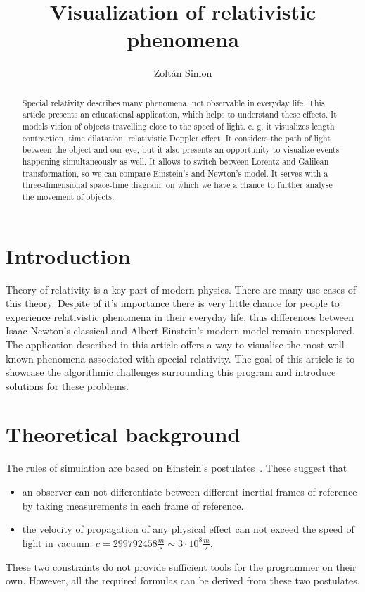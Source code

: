 \documentclass{egpubl}
\title[Visualization of relativity]{Visualization of relativistic phenomena}
\author{Zoltán Simon}
\begin{document}
\maketitle

\begin{abstract}
Special relativity describes many phenomena, not observable in everyday life. This article presents an educational application, which helps to understand these effects. It models vision of objects travelling close to the speed of light. e. g. it visualizes length contraction, time dilatation, relativistic Doppler effect. It considers the path of light between the object and our eye, but it also presents an opportunity to visualize events happening simultaneously as well. It allows to switch between Lorentz and Galilean transformation, so we can compare Einstein's and Newton's model. It serves with a three-dimensional space-time diagram, on which we have a chance to further analyse the movement of objects.
\end{abstract}

\section{Introduction}
\label{sec:introduction}
Theory of relativity is a key part of modern physics. There are many use cases of this theory. Despite of it's importance there is very little chance for people to experience relativistic phenomena in their everyday life, thus differences between Isaac Newton's classical and Albert Einstein's modern model remain unexplored. The application described in this article offers a way to visualise the most well-known phenomena associated with special relativity. The goal of this article is to showcase the algorithmic challenges surrounding this program and introduce solutions for these problems.

\section{Theoretical background}
\label{sec:theoretical_background}
The rules of simulation are based on Einstein's postulates~\cite{EinsteinElectrodynamics}. These suggest that
\begin{itemize}
\item an observer can not differentiate between different inertial frames of reference by taking measurements in each frame of reference.
\item the velocity of propagation of any physical effect can not exceed
the speed of light in vacuum: $c=299792458 \frac{m}{s} \sim 3 \cdot 10^8 \frac{m}{s}$.
 \end{itemize}
These two constraints do not provide sufficient tools for the programmer on their own. However, all the required formulas can be derived from these two postulates.
\end{document}
